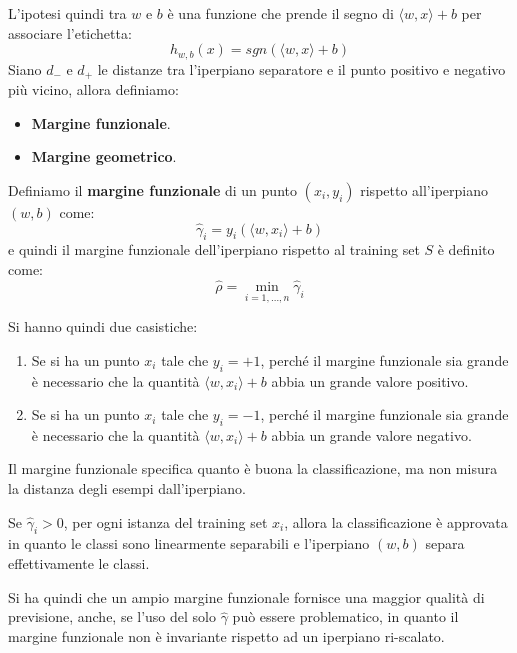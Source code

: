 L'ipotesi quindi tra $w$ e $b$ è una funzione che prende il segno di $\langle w,
    x \rangle + b$ per associare l'etichetta:
\begin{equation}
    h_{w,b} (x) = sgn(\langle w, x \rangle + b)
\end{equation}
Siano $d_{-}$ e $d_{+}$ le distanze tra l'iperpiano separatore e il punto positivo
e negativo più vicino, allora definiamo:
\begin{itemize}
    \item \textbf{Margine funzionale}.
    \item \textbf{Margine geometrico}.
\end{itemize}
\begin{definizione}
    Definiamo il \textbf{margine funzionale} di un punto $(x_i, y_i)$ rispetto
    all'iperpiano $(w, b)$ come:
    \begin{equation}
        \hat{\gamma}_i = y_i( \langle w, x_i \rangle + b )
    \end{equation}
    e quindi il margine funzionale dell'iperpiano rispetto al training set $S$ è
    definito come:
    \begin{equation}
        \hat{\rho} = \min_{i = 1, \dots, n} \hat{\gamma}_i
    \end{equation}
\end{definizione}
Si hanno quindi due casistiche:
\begin{enumerate}
    \item Se si ha un punto $x_i$ tale che $y_i = +1$, perché il margine
          funzionale sia grande è necessario che la quantità $\langle w, x_i
              \rangle + b$ abbia un grande valore positivo.
    \item Se si ha un punto $x_i$ tale che $y_i = -1$, perché il margine funzionale
          sia grande è necessario che la quantità $\langle w, x_i \rangle + b$
          abbia un grande valore negativo.
\end{enumerate}
Il margine funzionale specifica quanto è buona la classificazione, ma non misura
la distanza degli esempi dall'iperpiano.
\begin{teorema}
    Se $\hat{\gamma}_i > 0$, per ogni istanza del training set $x_i$, allora la
    classificazione è approvata in quanto le classi sono linearmente separabili
    e l'iperpiano $(w, b)$ separa effettivamente le classi.
\end{teorema}
Si ha quindi che un ampio margine funzionale fornisce una maggior qualità
di previsione, anche, se l'uso del solo $\hat{\gamma}$ può essere problematico,
in quanto il margine funzionale non è invariante rispetto ad un iperpiano ri-scalato.

